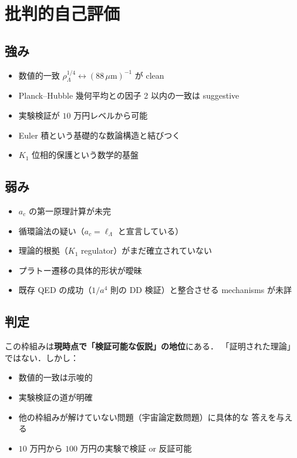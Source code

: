 \documentclass[11pt,a4paper]{article}
\begin{document}
\section{批判的自己評価}

\subsection{強み}

\begin{itemize}
\item 数値的一致 $\rho_\Lambda^{1/4} \leftrightarrow (88\,\mu\text{m})^{-1}$
が clean
\item Planck--Hubble 幾何平均との因子 2 以内の一致は suggestive
\item 実験検証が $10$ 万円レベルから可能
\item Euler 積という基礎的な数論構造と結びつく
\item $K_1$ 位相的保護という数学的基盤
\end{itemize}

\subsection{弱み}

\begin{itemize}
\item $a_c$ の第一原理計算が未完
\item 循環論法の疑い（$a_c = \ell_\Lambda$ と宣言している）
\item 理論的根拠（$K_1$ regulator）がまだ確立されていない
\item プラトー遷移の具体的形状が曖昧
\item 既存 QED の成功（$1/a^4$ 則の DD 検証）と整合させる
mechanisms が未詳
\end{itemize}

\subsection{判定}

この枠組みは\textbf{現時点で「検証可能な仮説」の地位}にある．
「証明された理論」ではない．しかし：
\begin{itemize}
\item 数値的一致は示唆的
\item 実験検証の道が明確
\item 他の枠組みが解けていない問題（宇宙論定数問題）に具体的な
答えを与える
\item $10$ 万円から $100$ 万円の実験で検証 or 反証可能
\end{itemize}
\end{document}
